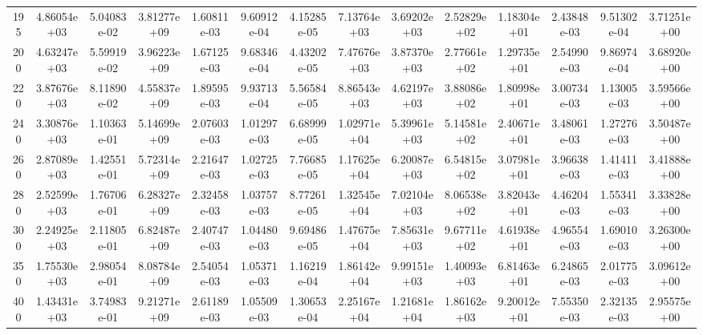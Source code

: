 \documentclass[
prb,
twocolumn,
superscriptaddress,
 amsmath,amssymb,
 aps,
longbibliography,
]{revtex4-2}
\begin{document}
\begin{table}[htbp!]
{\begin{tabular}{cccccccccccccc}
195 & 4.86054e+03 & 5.04083e-02 & 3.81277e+09 & 1.60811e-03 & 9.60912e-04 & 4.15285e-05 & 7.13764e+03 & 3.69202e+03 & 2.52829e+02 & 1.18304e+01 & 2.43848e-03 & 9.51302e-04 & 3.71251e+00\\
200 & 4.63247e+03 & 5.59919e-02 & 3.96223e+09 & 1.67125e-03 & 9.68346e-04 & 4.43202e-05 & 7.47676e+03 & 3.87370e+03 & 2.77661e+02 & 1.29735e+01 & 2.54990e-03 & 9.86974e-04 & 3.68920e+00\\
220 & 3.87676e+03 & 8.11890e-02 & 4.55837e+09 & 1.89595e-03 & 9.93713e-04 & 5.56584e-05 & 8.86543e+03 & 4.62197e+03 & 3.88086e+02 & 1.80998e+01 & 3.00734e-03 & 1.13005e-03 & 3.59566e+00\\
240 & 3.30876e+03 & 1.10363e-01 & 5.14699e+09 & 2.07603e-03 & 1.01297e-03 & 6.68999e-05 & 1.02971e+04 & 5.39961e+03 & 5.14581e+02 & 2.40671e+01 & 3.48061e-03 & 1.27276e-03 & 3.50487e+00\\
260 & 2.87089e+03 & 1.42551e-01 & 5.72314e+09 & 2.21647e-03 & 1.02725e-03 & 7.76685e-05 & 1.17625e+04 & 6.20087e+03 & 6.54815e+02 & 3.07981e+01 & 3.96638e-03 & 1.41411e-03 & 3.41888e+00\\
280 & 2.52599e+03 & 1.76706e-01 & 6.28327e+09 & 2.32458e-03 & 1.03757e-03 & 8.77261e-05 & 1.32545e+04 & 7.02104e+03 & 8.06538e+02 & 3.82043e+01 & 4.46204e-03 & 1.55341e-03 & 3.33828e+00\\
300 & 2.24925e+03 & 2.11805e-01 & 6.82487e+09 & 2.40747e-03 & 1.04480e-03 & 9.69486e-05 & 1.47675e+04 & 7.85631e+03 & 9.67711e+02 & 4.61938e+01 & 4.96554e-03 & 1.69010e-03 & 3.26300e+00\\
350 & 1.75530e+03 & 2.98054e-01 & 8.08784e+09 & 2.54054e-03 & 1.05371e-03 & 1.16219e-04 & 1.86142e+04 & 9.99151e+03 & 1.40093e+03 & 6.81463e+01 & 6.24865e-03 & 2.01775e-03 & 3.09612e+00\\
400 & 1.43431e+03 & 3.74983e-01 & 9.21271e+09 & 2.61189e-03 & 1.05509e-03 & 1.30653e-04 & 2.25167e+04 & 1.21681e+04 & 1.86162e+03 & 9.20012e+01 & 7.55350e-03 & 2.32135e-03 & 2.95575e+00\\

 \hline
  \end{tabular}
  }
\end{table}
\end{document}
